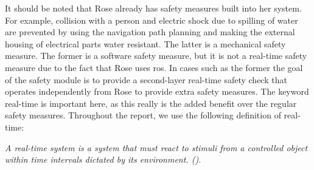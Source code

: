 \documentclass[12pt]{scrreprt}
\begin{document}
 
It should be noted that Rose already has safety measures built into her system. For example, collision with a person and electric shock due to spilling of water are prevented by using the navigation path planning and making the external housing of electrical parts water resistant. The latter is a mechanical safety measure. The former is a software safety measure, but it is not a real-time safety measure due to the fact that Rose uses \acrshort{ros}. In cases such as the former the goal of the safety module is to provide a second-layer real-time safety check that operates independently from Rose to provide extra safety measures. The keyword real-time is important here, as this really is the added benefit over the regular safety measures. Throughout the report, we use the following definition of real-time: 

\begin{flushleft}
\textit{
A real-time system is a system that must react to stimuli from a controlled object within time intervals dictated by its environment. (\cite{realtime_systems}).
}
\end{flushleft}
\end{document}
